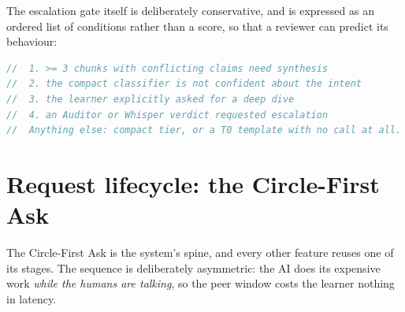 The escalation gate itself is deliberately conservative, and is expressed as an ordered
list of conditions rather than a score, so that a reviewer can predict its behaviour:

\begin{lstlisting}[language=Java,caption={Escalation conditions in the router, in evaluation order.}]
//  1. >= 3 chunks with conflicting claims need synthesis
//  2. the compact classifier is not confident about the intent
//  3. the learner explicitly asked for a deep dive
//  4. an Auditor or Whisper verdict requested escalation
//  Anything else: compact tier, or a T0 template with no call at all.
\end{lstlisting}

\section{Request lifecycle: the Circle-First Ask}
\label{sec:cfas}

The Circle-First Ask is the system's spine, and every other feature reuses one of its
stages. The sequence is deliberately asymmetric: the AI does its expensive work
\emph{while the humans are talking}, so the peer window costs the learner nothing in
latency.

